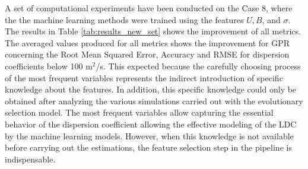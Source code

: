 \documentclass[a4paper,12pt, english]{article}
\begin{document}
A set of computational experiments have been conducted on the Case 8, 
where the the machine learning methods were trained using the  features  $U, B$, and $\sigma$.
The results in Table \ref{tab:results_new_set} shows the improvement of all metrics. 
The averaged values produced for all metrics shows the improvement for GPR  concerning the Root Mean Squared Error, Accuracy and RMSE for dispersion coefficients below 100 m$^2$/s.
% 
This expected because the carefully choosing process of the most frequent variables  represents the indirect introduction of specific knowledge about the features. 
In addition, this specific knowledge could only be obtained after analyzing the various simulations carried out with the evolutionary selection model.
The most frequent variables allow capturing the essential behavior of the dispersion coefficient allowing the effective modeling of the LDC by the machine learning models. 
However, when this knowledge is not available before carrying out the estimations, the feature selection step in the pipeline is indispensable.
\end{document}
